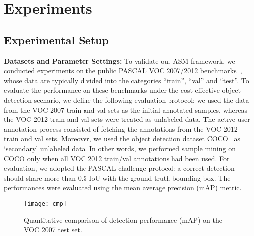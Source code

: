 \documentclass[journal]{IEEEtran}
\begin{document}
{\section{Experiments}
\label{sec:exper}


\subsection{Experimental Setup}
\textbf{Datasets and Parameter Settings:} To validate our {ASM} framework, we conducted experiments on the public PASCAL VOC 2007/2012 benchmarks~\cite{voc2007}, whose data are typically divided into the categories ``train'', ``val'' and ``test''. To evaluate the performance on these benchmarks {under the cost-effective object detection scenario, we define the following evaluation protocol:} we used {the data from} the VOC 2007 train and val sets as the initial annotated samples, whereas the VOC 2012 train and val sets were treated as unlabeled data. The active user annotation process consisted of fetching the annotations from the VOC 2012 train and val sets. Moreover, we used the object detection dataset COCO~\cite{coco14ECCV} as `secondary' unlabeled data. In other words, we performed sample mining on COCO only when all VOC 2012 train/val annotations had been used. {For evaluation}, we adopted the PASCAL challenge protocol: a correct detection should share more than 0.5 IoU with the ground-truth bounding box. The performances were evaluated using the mean average precision (mAP) metric. 

\begin{figure}[tbp]
\center
\texttt{[image: cmp]}
\vspace{-10pt}
\caption{{Quantitative comparison of detection performance (mAP) on the VOC 2007 test set.}}\label{fig:cmp}
\vspace{-15pt}
\end{figure}

}
\end{document}
